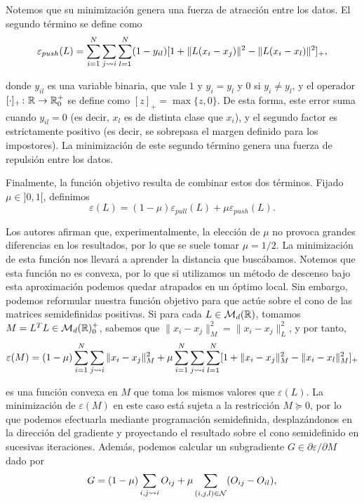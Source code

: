 Notemos que su minimización genera una fuerza de atracción entre los datos. El segundo término se define como
\[ \varepsilon_{push}(L) = \sum_{i=1}^{N}\sum_{j\rightsquigarrow i}\sum_{l=1}^{N} (1 - y_{il})[1 + \|L(x_i-x_j)\|^2 - \|L(x_i-x_l)\|^2]_{+}, \]

donde $y_{il}$ es una variable binaria, que vale $1$ y $y_i = y_l$ y $0$ si $y_i \ne y_l$, y el operador $[ \cdot ]_{+}\colon  \mathbb{R} \to \mathbb{R}^+_0$ se define como $[z]_{+} = \max\{z,0\}$. De esta forma, este error suma cuando $y_{il} = 0$ (es decir, $x_l$ es de distinta clase que $x_i$), y el segundo factor es estrictamente positivo (es decir, se sobrepasa el margen definido para los impostores). La minimización de este segundo término genera una fuerza de repulsión entre los datos.

Finalmente, la función objetivo resulta de combinar estos dos términos. Fijado $\mu \in ]0,1[$, definimos
\begin{equation} \label{eq:lmnn:L}
\varepsilon(L) = (1 - \mu)\varepsilon_{pull}(L) + \mu\varepsilon_{push}(L).
\end{equation}

Los autores afirman que, experimentalmente, la elección de $\mu$ no provoca grandes diferencias en los resultados, por lo que se suele tomar $\mu = 1/2$. La minimización de esta función nos llevará a aprender la distancia que buscábamos. Notemos que esta función no es convexa, por lo que si utilizamos un método de descenso bajo esta aproximación podemos quedar atrapados en un óptimo local. Sin embargo, podemos reformular nuestra función objetivo para que actúe sobre el cono de las matrices semidefinidas positivas. Si para cada $L \in \mathcal{M}_d(\mathbb{R})$, tomamos $M = L^TL \in \mathcal{M}_d(\mathbb{R})^+_0$, sabemos que $\|x_i-x_j\|_M^2 = \|x_i - x_j\|_L^2$, y por tanto,
\begin{equation} \label{eq:lmnn:M}
 \varepsilon(M) = (1-\mu) \sum_{i=1}^{N}\sum_{j\rightsquigarrow i} \|x_i - x_j\|_M^2 + \mu \sum_{i=1}^{N}\sum_{j\rightsquigarrow i}\sum_{l=1}^N [ 1 + \|x_i - x_j\|_M^2 - \|x_i - x_l\|_M^2]_{+}
\end{equation}

es una función convexa en $M$ que toma los mismos valores que $\varepsilon(L)$. La minimización de $\varepsilon(M)$ en este caso está sujeta a la restricción $M \succeq 0$, por lo que podemos efectuarla mediante programación semidefinida, desplazándonos en la dirección del gradiente y proyectando el resultado sobre el cono semidefinido en sucesivas iteraciones. Además, podemos calcular un subgradiente $G \in \partial \varepsilon / \partial M$ dado por
\[ G = (1-\mu) \sum_{i,j\rightsquigarrow i} O_{ij} + \mu \sum_{(i,j,l) \in \mathcal{N}} (O_{ij} - O_{il}), \]

